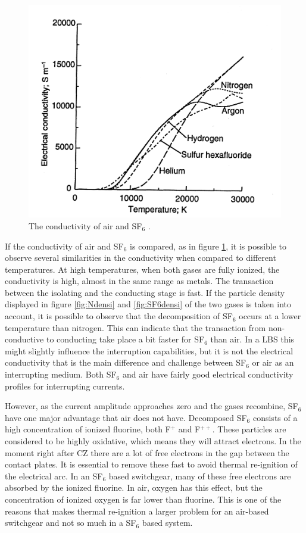 \documentclass[10pt,a4paper]{article} %
\begin{document}
\begin{figure}[H]
\centering
\includegraphics[scale=1]{Bilder/Discussion/conductSF6AndAIR.png}
\caption{The conductivity of air and SF${_6}$ \cite{bib:THFD}.} \label{fig:AirandSF6ConComp}
\end{figure}

If the conductivity of air and SF$_6$ is compared, as in figure \ref{fig:AirandSF6ConComp}, it is possible to observe several similarities in the conductivity when compared to different temperatures. At high temperatures, when both gases are fully ionized, the conductivity is high, almost in the same range as metals. The transaction between the isolating and the conducting stage is fast. If the particle density displayed in figure \ref{fig:Ndensi} and \ref{fig:SF6densi} of the two gases is taken into account, it is possible to observe that the decomposition of SF$_6$ occurs at a lower temperature than nitrogen. This can indicate that the transaction from non-conductive to conducting take place a bit faster for SF$_6$ than air. In a LBS this might slightly influence the interruption capabilities, but it is not the electrical conductivity that is the main difference and challenge between SF$_6$ or air as an interrupting medium. Both SF$_6$ and air have fairly good electrical conductivity profiles for interrupting currents.

However, as the current amplitude approaches zero and the gases recombine, SF$_6$ have one major advantage that air does not have. Decomposed SF$_6$ consists of a high concentration of ionized fluorine, both F$^{+}$ and F$^{++}$. These particles are considered to be highly oxidative, which means they will attract electrons. In the moment right after CZ there are a lot of free electrons in the gap between the contact plates. It is essential to remove these fast to avoid thermal re-ignition of the electrical arc. In an SF$_6$ based switchgear, many of these free electrons are absorbed by the ionized fluorine. In air, oxygen has this effect, but the concentration of ionized oxygen is far lower than fluorine. This is one of the reasons that makes thermal re-ignition a larger problem for an air-based switchgear and not so much in a SF$_6$ based system.
\end{document}
